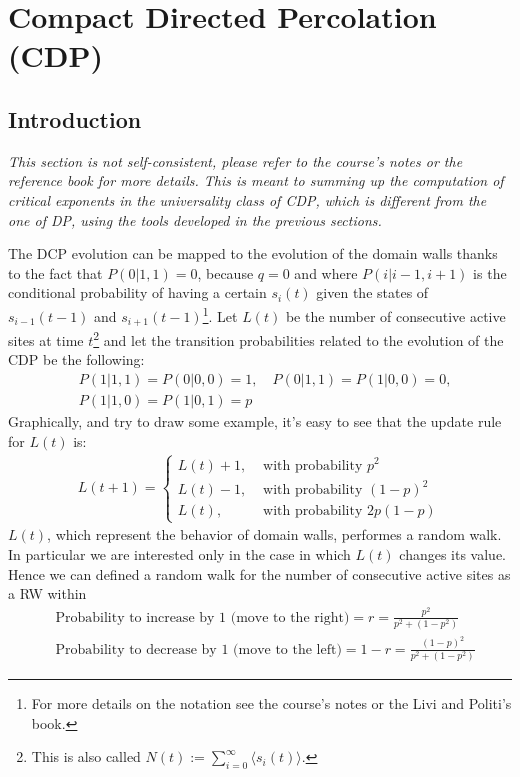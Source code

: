 \documentclass[4apaper,11pt,fleqn]{article}
\theoremstyle{remark}
\theoremstyle{definition}
\begin{document}
\section{Compact Directed Percolation (CDP)}

\subsection{Introduction}
\emph{This section is not self-consistent, please refer to the course's notes or the reference book for more details. This is meant to summing up the computation of critical exponents in the universality class of CDP, which is different from the one of DP, using the tools developed in the previous sections.}

The DCP evolution can be mapped to the evolution of the domain walls thanks to the fact that $P(0|1,1)=0$, because $q=0$ and where $P(i|i-1,i+1)$ is the conditional probability of having a certain $s_i(t)$ given the states of $s_{i-1}(t-1)$ and $s_{i+1}(t-1)$\;\footnote{For more details on the notation see the course's notes or the Livi and Politi's book.}. Let $L(t)$ be the number of consecutive active sites at time $t$\;\footnote{This is also called $N(t) := \sum_{i=0}^{\infty} \langle s_i(t) \rangle$.} and let the transition probabilities related to the evolution of the CDP be the following:
\begin{align*}
  &P(1|1,1) = P(0|0,0) = 1, \quad P(0|1,1) = P(1|0,0) = 0, \\
  &P(1|1,0) = P(1|0,1) = p
\end{align*}
Graphically, and try to draw some example, it's easy to see that the update rule for $L(t)$ is:
\begin{align}
  L(t+1)=\left\{\begin{array}{cl}{L(t)+1,} & {\text { with probability } p^{2}} \\ {L(t)-1,} & {\text { with probability }(1-p)^{2}} \\ {L(t),} & {\text { with probability } 2 p(1-p)}\end{array}\right.
\end{align}
$L(t)$, which represent the behavior of domain walls, performes a random walk. In particular we are interested only in the case in which $L(t)$ changes its value. Hence we can defined a random walk for the number of consecutive active sites as a RW within
\begin{align*}
  &\text{Probability to increase by 1 (move to the right)} = r = \frac{p^2}{p^2+(1-p^2)} \\
  &\text{Probability to decrease by 1 (move to the left)}  = 1-r = \frac{(1-p)^2}{p^2+(1-p^2)}
\end{align*}
\end{document}

